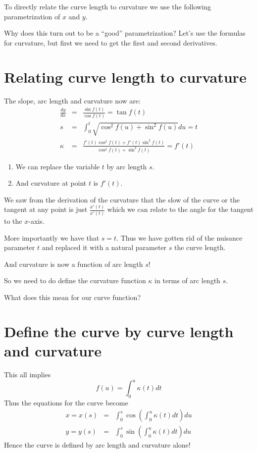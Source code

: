\documentclass[]{article} %
\theoremstyle{definition}
\theoremstyle{theorem}
\begin{document}
To directly relate the curve length to curvature we use the following parametrization of $x$ and $y$. 

Why does this turn out to be a ``good'' parametrization? Let's use the formulas for curvature, but first we need to get the first and second derivatives.

\section{Relating curve length to curvature}
\begin{tcolorbox}
	The slope, arc length and curvature now are:
	\begin{eqnarray*}
	\frac{dy}{dx} &=& \frac{\sin f(t)}{\cos f(t)} = \tan f(t) \\
 	s &=& \int_0^t \sqrt{\cos^2 f(u) + \sin^2 f(u)} du = t \\
 	\kappa &=& \frac{f'(t) \cos^2 f(t) + f'(t) \sin^2 f(t)}{\cos^2 f(t) + \sin^2 f(t)} = f'(t)
 \end{eqnarray*}
	\begin{enumerate}
		\item We can replace the variable $t$ by arc length $s$.
		\item And curvature at point $t$ is $f'(t)$. 
	\end{enumerate}
\end{tcolorbox}

We saw from the derivation of the curvature that the slow of the curve or the tangent at any point is just $\frac{x'(t)}{x'(t)}$ which we can relate to the angle for the tangent to the $x$-axis.

More importantly we have that $s=t$. Thus we have gotten rid of the nuisance parameter $t$ and replaced it with a natural parameter $s$ the curve length.

And curvature is now a function of arc length $s$! 

So we need to do define the curvature function $\kappa$ in terms of arc length $s$.

What does this mean for our curve function?

\section{Define the curve by curve length and curvature}
\begin{tcolorbox}
	 This all implies
	 \[
	 f(u) = \int_{0}^{u} \kappa(t) dt
	 \]
	Thus the equations for the curve become
	\begin{eqnarray*}
	x = x(s) &=& \int_{0}^{s} \cos \left( \int_0^u \kappa(t) dt \right) du \\
	y = y(s) &=& \int_{0}^{s} \sin \left( \int_0^u \kappa(t) dt \right) du
	\end{eqnarray*}
	Hence the curve is defined by arc length and curvature alone!
\end{tcolorbox}
\end{document}
